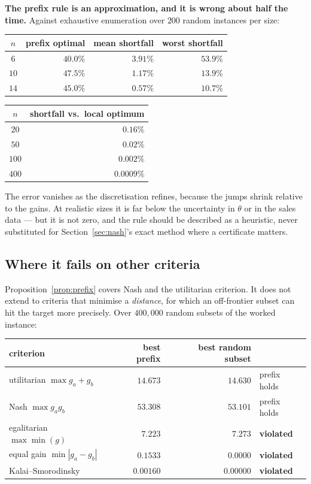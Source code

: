 \documentclass[11pt]{article}
\theoremstyle{remark}\newtheorem*{remark}{Remark}
\begin{document}
\begin{warnbox}
\textbf{The prefix rule is an approximation, and it is wrong about half the time.}
Against exhaustive enumeration over $200$ random instances per size:

\begin{center}
\begin{tabular}{crrr}
\toprule
$n$ & prefix optimal & mean shortfall & worst shortfall\\
\midrule
$6$ & $40.0\%$ & $3.91\%$ & $53.9\%$\\
$10$ & $47.5\%$ & $1.17\%$ & $13.9\%$\\
$14$ & $45.0\%$ & $0.57\%$ & $10.7\%$\\
\bottomrule
\end{tabular}
\qquad
\begin{tabular}{cr}
\toprule
$n$ & shortfall vs.\ local optimum\\
\midrule
$20$ & $0.16\%$\\
$50$ & $0.02\%$\\
$100$ & $0.002\%$\\
$400$ & $0.0009\%$\\
\bottomrule
\end{tabular}
\end{center}

\noindent The error vanishes as the discretisation refines, because the jumps shrink
relative to the gains. At realistic sizes it is far below the uncertainty in $\theta$
or in the sales data --- but it is not zero, and the rule should be described as a
heuristic, never substituted for Section~\ref{sec:nash}'s exact method where a
certificate matters.
\end{warnbox}

\subsection{Where it fails on other criteria}
Proposition~\ref{prop:prefix} covers Nash and the utilitarian criterion. It does not
extend to criteria that minimise a \emph{distance}, for which an off-frontier subset can
hit the target more precisely. Over $400{,}000$ random subsets of the worked instance:

\begin{center}\begin{tabular}{lrrl}\toprule
criterion & best prefix & best random subset & \\ \midrule
utilitarian $\max g_a+g_b$ & $14.673$ & $14.630$ & prefix holds\\
Nash $\max g_ag_b$ & $53.308$ & $53.101$ & prefix holds\\
egalitarian $\max\min(g)$ & $7.223$ & $7.273$ & \textbf{violated}\\
equal gain $\min|g_a-g_b|$ & $0.1533$ & $0.0000$ & \textbf{violated}\\
Kalai--Smorodinsky & $0.00160$ & $0.00000$ & \textbf{violated}\\
\bottomrule\end{tabular}\end{center}
\end{document}
